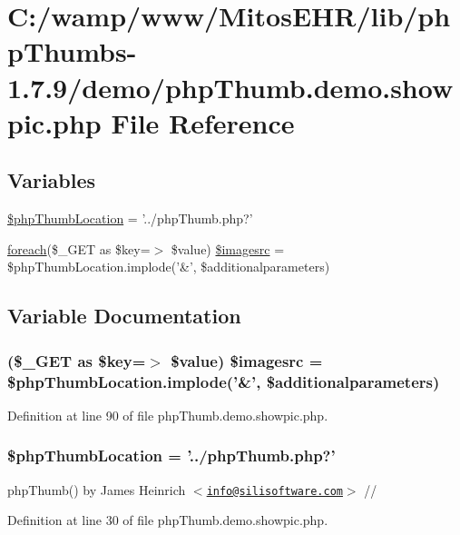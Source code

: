 \hypertarget{php_thumb_8demo_8showpic_8php}{\section{\-C\-:/wamp/www/\-Mitos\-E\-H\-R/lib/php\-Thumbs-\/1.7.9/demo/php\-Thumb.demo.\-showpic.\-php \-File \-Reference}
\label{php_thumb_8demo_8showpic_8php}
}
\subsection*{\-Variables}
\begin{DoxyCompactItemize}
\item 
\hyperlink{php_thumb_8demo_8showpic_8php_a7428dafddeba7b70ee2bbeee0283d4f3}{\$php\-Thumb\-Location} = '../php\-Thumb.\-php?'
\item 
\hyperlink{php_thumb_8demo_8demo_8php_a9caa026f841c5a6057418795d37e0ef9}{foreach}(\$\-\_\-\-G\-E\-T as \$key=$>$ \$value) \hyperlink{php_thumb_8demo_8showpic_8php_a3da39829fbb99192f578131e14ec7bc0}{\$imagesrc} = \$php\-Thumb\-Location.\-implode('\&', \$additionalparameters)
\end{DoxyCompactItemize}


\subsection{\-Variable \-Documentation}
\hypertarget{php_thumb_8demo_8showpic_8php_a3da39829fbb99192f578131e14ec7bc0}{
\subsubsection[{\$imagesrc}]{ (\$\-\_\-\-G\-E\-T as \$key=$>$ \$value) \$imagesrc = \$php\-Thumb\-Location.\-implode('\&', \$additionalparameters)}}\label{php_thumb_8demo_8showpic_8php_a3da39829fbb99192f578131e14ec7bc0}


\-Definition at line 90 of file php\-Thumb.\-demo.\-showpic.\-php.

\hypertarget{php_thumb_8demo_8showpic_8php_a7428dafddeba7b70ee2bbeee0283d4f3}{
\subsubsection[{\$php\-Thumb\-Location}]{\setlength{\rightskip}{0pt plus 5cm}\$php\-Thumb\-Location = '../php\-Thumb.\-php?'}}\label{php_thumb_8demo_8showpic_8php_a7428dafddeba7b70ee2bbeee0283d4f3}
php\-Thumb() by \-James \-Heinrich $<$\href{mailto:info@silisoftware.com}{\tt info@silisoftware.\-com}$>$ // 

\-Definition at line 30 of file php\-Thumb.\-demo.\-showpic.\-php.

